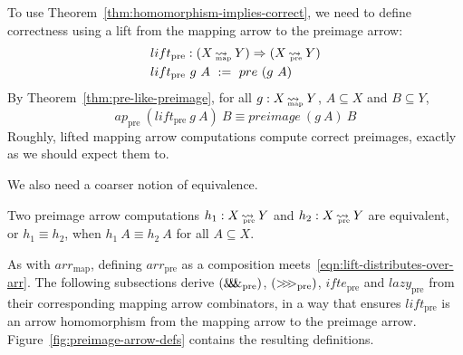 \documentclass[preprint]{sigplanconf}
\newcommand{\arrow}{\rightsquigarrow}
\newcommand{\arrowlift}{\ensuremath{lift}}
\newcommand{\arrowarr}{\ensuremath{arr}}
\newcommand{\arrowcomp}{\ensuremath{{>}\mspace{-6mu}{>}\mspace{-6mu}{>}}}
\newcommand{\arrowpair}{\ensuremath{\mathit{\&\mspace{-7.5mu}\&\mspace{-7.5mu}\&}}}
\newcommand{\arrowif}{\ensuremath{ifte}}
\newcommand{\arrowlazy}{\ensuremath{lazy}}
\newcommand{\map}{_\mathrm{map}}
\DeclareMathOperator{\mapto}{\arrow_{\mspace{-21mu}\map}}
\newcommand{\arrmap}{\arrowarr\map}
\newcommand{\pre}{_\mathrm{pre}}
\DeclareMathOperator{\preto}{\arrow_{\mspace{-19mu}\pre}}
\newcommand{\liftpre}{\arrowlift\pre}
\newcommand{\arrpre}{\arrowarr\pre}
\newcommand{\comppre}{\arrowcomp\pre}
\newcommand{\pairpre}{\arrowpair\pre}
\newcommand{\ifpre}{\arrowif\pre}
\newcommand{\lazypre}{\arrowlazy\pre}
\begin{document}
To use Theorem~\ref{thm:homomorphism-implies-correct}, we need to define correctness using a lift from the mapping arrow to the preimage arrow:
\begin{equation}
\begin{aligned}
	&\liftpre : (X \mapto Y) \tto (X \preto Y) \\
	&\liftpre~g~A \ := \ pre~(g~A)
\end{aligned}
\end{equation}
By Theorem~\ref{thm:pre-like-preimage}, for all $g : X \mapto Y$, $A \subseteq X$ and $B \subseteq Y$,
\begin{equation}
	ap\pre~(\liftpre~g~A)~B \equiv preimage~(g~A)~B
\end{equation}
Roughly, lifted mapping arrow computations compute correct preimages, exactly as we should expect them to.

We also need a coarser notion of equivalence.

\begin{definition}
Two preimage arrow computations $h_1 : X \preto Y$ and $h_2 : X \preto Y$ are equivalent, or $h_1 \equiv h_2$, when 
$h_1~A \equiv h_2~A$ for all $A \subseteq X$.
\end{definition}

As with $\arrmap$, defining $\arrpre$ as a composition meets~\eqref{eqn:lift-distributes-over-arr}.
The following subsections derive $(\pairpre)$, $(\comppre)$, $\ifpre$ and $\lazypre$ from their corresponding mapping arrow combinators, in a way that ensures $\liftpre$ is an arrow homomorphism from the mapping arrow to the preimage arrow. Figure~\ref{fig:preimage-arrow-defs} contains the resulting definitions.
\end{document}
